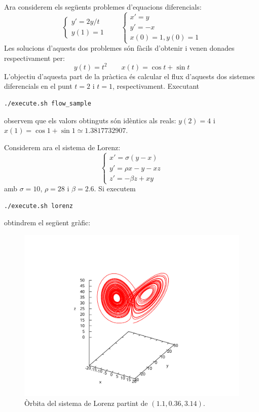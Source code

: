 \documentclass[10pt,a4paper]{article}
\theoremstyle{definition}
\theoremstyle{remark}
\begin{document}
Ara considerem els següents problemes d'equacions diferencials:
$$
  \begin{cases}
    y'=2 y/t \\
    y(1)=1
  \end{cases}\qquad
  \begin{cases}
    x'=y  \\
    y'=-x \\
    x(0)=1, y(0)=1
  \end{cases}
$$
Les solucions d'aquests dos problemes són fàcils d'obtenir i venen donades respectivament per:
$$
  y(t)=t^2\qquad x(t)=\cos t + \sin t
$$
L'objectiu d'aquesta part de la pràctica és calcular el flux d'aquests dos sistemes diferencials en el punt $t=2$ i $t=1$, respectivament. Executant
\begin{lstlisting}[language=Bash]
./execute.sh flow_sample
\end{lstlisting}
observem que els valors obtinguts són idèntics als reals: $y(2)=4$ i $x(1)=\cos 1 + \sin 1\simeq 1.3817732907$.

Considerem ara el sistema de Lorenz:
$$
  \begin{cases}
    x'=\sigma(y-x)     \\
    y'=\rho x - y - xz \\
    z'=-\beta z + xy
  \end{cases}
$$
amb $\sigma=10$, $\rho=28$ i $\beta=2.6$. Si executem
\begin{lstlisting}[language=Bash]
./execute.sh lorenz
\end{lstlisting}
obtindrem el següent gràfic:
\begin{figure}[ht]
  \centering\vspace{-2cm}
  \includegraphics[width=0.7\linewidth]{Images/lorenz.pdf}
  \caption{Òrbita del sistema de Lorenz partint de $(1.1,0.36,3.14)$.}
\end{figure}
\end{document}
